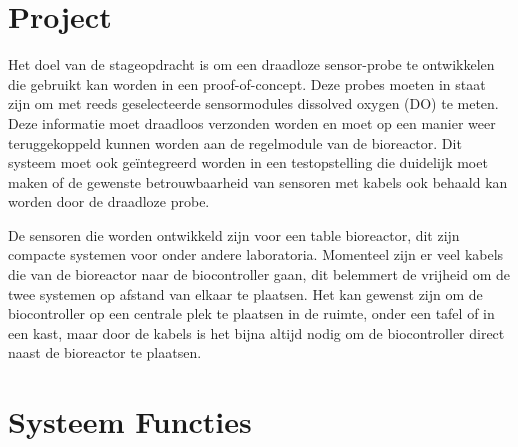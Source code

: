 \section{Project}
Het doel van de stageopdracht is om een draadloze sensor-probe te ontwikkelen die gebruikt kan worden in een proof-of-concept. Deze probes moeten in staat zijn om met reeds geselecteerde sensormodules dissolved oxygen (DO) te meten. Deze informatie moet draadloos verzonden worden en
moet op een manier weer teruggekoppeld kunnen worden aan de regelmodule van de bioreactor. Dit systeem moet ook ge{\"i}ntegreerd worden in een testopstelling die duidelijk moet maken of de gewenste betrouwbaarheid van sensoren met kabels ook behaald kan worden door de draadloze probe.


De sensoren die worden ontwikkeld zijn voor een table bioreactor, dit zijn compacte systemen voor onder andere laboratoria. Momenteel zijn er veel kabels die van de bioreactor naar de biocontroller gaan, dit belemmert de vrijheid om de twee systemen op afstand van elkaar te plaatsen. Het kan gewenst zijn om de biocontroller op een centrale plek te plaatsen in de ruimte, onder een tafel of in een kast, maar door de kabels is het bijna altijd nodig om de biocontroller direct naast de bioreactor te plaatsen. 
 
\section{Systeem Functies}

